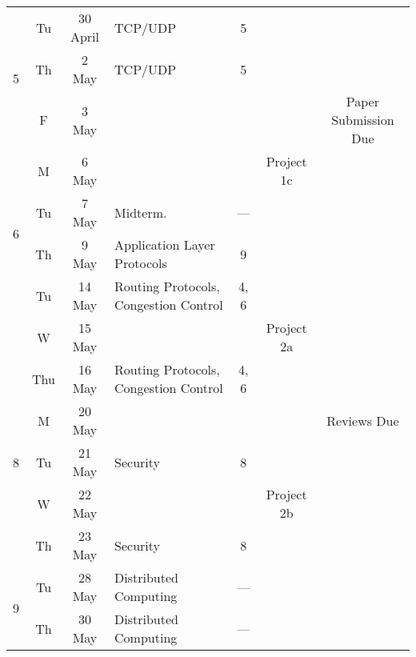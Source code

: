 \documentclass[11pt]{article}
\begin{document}
\begin{sidewaystable}
\begin{tabular}{|c|cc||p{8cm}|c|c|c|}
\multirow{3}{*}{5}  
                    & Tu & 30 April & TCP/UDP                          & 5 & \cellcolor[gray]{0.9}  & \cellcolor[gray]{0.9} \\\cline{2-6}
                    & Th & 2 May & TCP/UDP                              & 5 & \cellcolor[gray]{0.9}  & \cellcolor[gray]{0.9} \\\cline{2-6}
                    & F & 3 May & \cellcolor[gray]{0.9} & \cellcolor[gray]{0.9} &  \cellcolor[gray]{0.9} & Paper Submission Due\\\hline\hline

\multirow{4}{*}{6}  & M & 6 May & \cellcolor[gray]{0.9} & \cellcolor[gray]{0.9} &  Project 1c & \cellcolor[gray]{0.9} \\\cline{2-6}
                    & Tu & 7 May  & Midterm.        & --- & \cellcolor[gray]{0.9}  & \cellcolor[gray]{0.9} \\\cline{2-6}
                    & Th & 9 May  & Application Layer Protocols                         & 9 & \cellcolor[gray]{0.9}  & \cellcolor[gray]{0.9} \\\hline\hline

\multirow{3}{*}{7}  & Tu & 14 May   & Routing Protocols, Congestion Control                                & 4, 6 & \cellcolor[gray]{0.9} & \cellcolor[gray]{0.9} \\\cline{2-6}
                    & W & 15 May  & \cellcolor[gray]{0.9} & \cellcolor[gray]{0.9} & Project 2a & \cellcolor[gray]{0.9} \\\cline{2-6}
                    & Thu & 16 May   & Routing Protocols, Congestion Control                                & 4, 6 & \cellcolor[gray]{0.9}  & \cellcolor[gray]{0.9} \\\hline\hline

\multirow{3}{*}{8}  & M & 20 May    & \cellcolor[gray]{0.9} & \cellcolor[gray]{0.9} &  \cellcolor[gray]{0.9} & Reviews Due \\\cline{2-7}
                    & Tu & 21 May   & Security                                & 8 & \cellcolor[gray]{0.9}  & \cellcolor[gray]{0.9} \\\cline{2-6}
                    & W & 22 May  & \cellcolor[gray]{0.9} & \cellcolor[gray]{0.9} & Project 2b & \cellcolor[gray]{0.9} \\\cline{2-6}
                    & Th & 23 May   & Security           & 8 & \cellcolor[gray]{0.9}  & \cellcolor[gray]{0.9} \\\hline\hline

\multirow{2}{*}{9}  & Tu & 28 May   & Distributed Computing      & --- & \cellcolor[gray]{0.9}  & \cellcolor[gray]{0.9} \\\cline{2-6}
                    & Th & 30 May   & Distributed Computing      & --- & \cellcolor[gray]{0.9}  & \cellcolor[gray]{0.9} \\\hline\hline


\end{tabular}
\end{sidewaystable}
\end{document}
